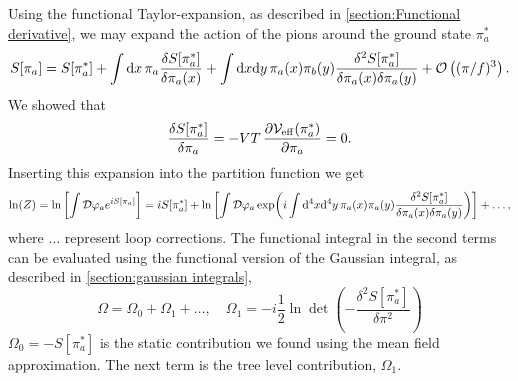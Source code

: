 Using the functional Taylor-expansion, as described in \autoref{section:Functional derivative}, we may expand the action of the pions around the ground state $\pi_a^* $
\begin{equation}
    S[\pi_a]
    = 
    S[\pi_a^*] 
    + \int \dd x \, \pi_a  \frac{\delta S[\pi_a^*]}{\delta \pi_a(x)}
    + \int \dd x \dd y \, \pi_a(x) \pi_b(y)
    \frac{\delta^2 S[\pi_a^*]}{\delta \pi_a(x) \delta \pi_a(y)}
    + \Oh[3]{(\pi/f)}.
\end{equation} 
We showed that
\begin{equation}
    \frac{\delta S[\pi_a^*]}{\delta \pi_a} = -VT\, \diffp{\Veff(\pi_a^*)}{\pi_a} = 0.
\end{equation}
Inserting this expansion into the partition function we get
\begin{equation}
    \ln(Z) = \ln\left[ \int \D \varphi_a e^{i S[\pi_a]} \right]
    = i S[\pi_a^*] + \ln\left[
        \int \D \varphi_a 
        \exp(
            i \int \dd^4 x \dd^4 y \, \pi_a(x) \pi_a(y)
            \frac{\delta^2 S[\pi_a^*]}{\delta \pi_a(x) \delta \pi_a(y)}
            ) 
    \right]
    + \dots,
\end{equation}
where $\dots$ represent loop corrections.
The functional integral in the second terms can be evaluated using the functional version of the Gaussian integral, as described in \autoref{section:gaussian integrals},
\begin{equation}
    \label{Free energy to second order}
    \Omega 
    = \Omega_0 + \Omega_ 1 + \dots, \quad 
    \Omega_1 = -i \frac{1}{2} \ln{\det\left( - \frac{\delta^2 S[\pi_a^*]}{\delta \pi^2} \right)}
\end{equation}
$\Omega_0 = -S[\pi_a^* ]$ is the static contribution we found using the mean field approximation.
The next term is the tree level contribution, $\Omega_1$.
